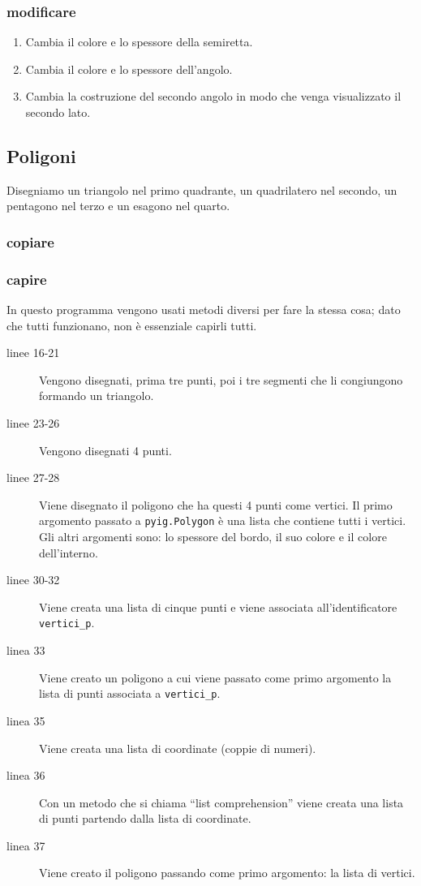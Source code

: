 \subsubsection{modificare}

\begin{enumerate} [noitemsep]
 \item Cambia il colore e lo spessore della semiretta.
 \item Cambia il colore e lo spessore dell'angolo.
 \item Cambia la costruzione del secondo angolo in modo che venga visualizzato 
il secondo lato.
\end{enumerate}

\subsection{Poligoni}
\label{subsec:geo_int_poligoni}

Disegniamo un triangolo nel primo quadrante, un quadrilatero nel secondo, un 
pentagono nel terzo e un esagono nel quarto.

\subsubsection{copiare}



\subsubsection{capire}

In questo programma vengono usati metodi diversi per fare la stessa cosa; dato 
che tutti funzionano, non è essenziale capirli tutti.

\begin{description}
 \item [linee 16-21]
Vengono disegnati, prima tre punti, poi i tre segmenti che li congiungono 
formando un triangolo.
 \item [linee 23-26]
Vengono disegnati 4 punti.
 \item [linee 27-28]
Viene disegnato il poligono che ha questi 4 punti come vertici.
Il primo argomento passato a \lstinline{pyig.Polygon} è una lista che contiene 
tutti i vertici.
Gli altri argomenti sono: lo spessore del bordo, il suo colore e il colore 
dell'interno.
 \item [linee 30-32]
Viene creata una lista di cinque punti e viene associata all'identificatore 
\lstinline{vertici_p}.
 \item [linea 33]
Viene creato un poligono a cui viene passato come primo argomento la lista di 
punti associata a \lstinline{vertici_p}.
 \item [linea 35]
Viene creata una lista di coordinate (coppie di numeri).
 \item [linea 36]
Con un metodo che si chiama ``list comprehension'' viene creata una lista di 
punti partendo dalla lista di coordinate.
 \item [linea 37]
Viene creato il poligono passando come primo argomento: la lista di vertici.
\end{description}

